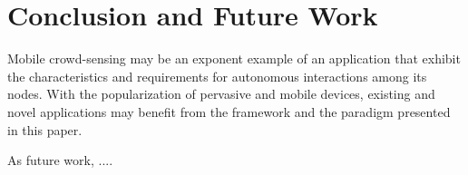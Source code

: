 \section{Conclusion and Future Work}\label{sec:conclusion}


Mobile crowd-sensing may be an exponent example of an application that exhibit the characteristics and requirements for autonomous interactions among its nodes. With the popularization of pervasive and mobile devices, existing and novel applications may benefit from the framework and the paradigm presented in this paper.


As future work, ....
